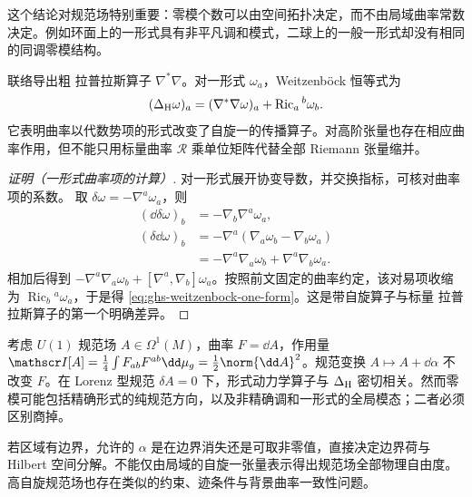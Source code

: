 这个结论对规范场特别重要：零模个数可以由空间拓扑决定，而不由局域曲率常数决定。例如环面上的一形式具有非平凡调和模式，二球上的一般一形式却没有相同的同调零模结构。

联络导出粗 拉普拉斯算子 $\nabla^*\nabla$。对一形式 $\omega_a$，Weitzenböck 恒等式为
\begin{equation}\label{eq:ghs-weitzenbock-one-form}
 (\Delta_{\rm H}\omega)_a=(\nabla^*\nabla\omega)_a
 +\operatorname{Ric}_a{}^b\omega_b.
\end{equation}
它表明曲率以代数势项的形式改变了自旋一的传播算子。对高阶张量也存在相应曲率作用，但不能只用标量曲率 $\mathcal R$ 乘单位矩阵代替全部 Riemann 张量缩并。

\begin{proof}[证明（一形式曲率项的计算）]
对一形式展开协变导数，并交换指标，可核对曲率项的系数。
取 $\delta\omega=-\nabla^a\omega_a$，则
\begin{align*}
(\dd\delta\omega)_b&=-\nabla_b\nabla^a\omega_a,\\
(\delta\dd\omega)_b&=-\nabla^a(\nabla_a\omega_b-\nabla_b\omega_a)\\
&=-\nabla^a\nabla_a\omega_b+\nabla^a\nabla_b\omega_a.
\end{align*}
相加后得到 $-\nabla^a\nabla_a\omega_b+[\nabla^a,\nabla_b]\omega_a$。按照前文固定的曲率约定，该对易项收缩为 $\operatorname{Ric}_b{}^a\omega_a$，于是得 \cref{eq:ghs-weitzenbock-one-form}。这是带自旋算子与标量 拉普拉斯算子的第一个明确差异。

\end{proof}

考虑 $U(1)$ 规范场 $A\in\Omega^1(M)$，曲率 $F=\dd A$，作用量 $\mathscr I[A]=\frac14\int F_{ab}F^{ab}\dd\mu_g=\frac12\norm{\dd A}^2$。规范变换 $A\mapsto A+\dd\alpha$ 不改变 $F$。在 Lorenz 型规范 $\delta A=0$ 下，形式动力学算子与 $\Delta_{\rm H}$ 密切相关。然而零模可能包括精确形式的纯规范方向，以及非精确调和一形式的全局模态；二者必须区别商掉。

若区域有边界，允许的 $\alpha$ 是在边界消失还是可取非零值，直接决定边界荷与 Hilbert 空间分解。不能仅由局域的自旋一张量表示得出规范场全部物理自由度。高自旋规范场也存在类似的约束、迹条件与背景曲率一致性问题。

